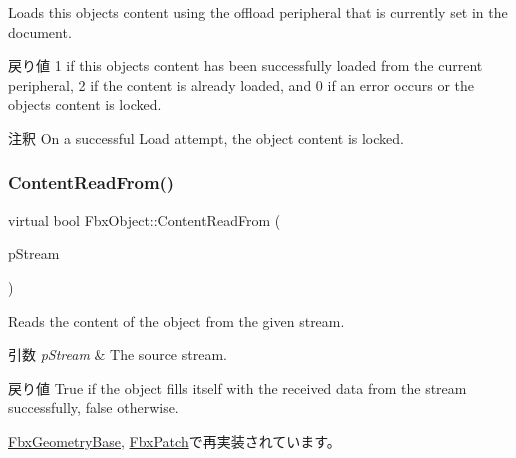 Loads this object\textquotesingle{}s content using the offload peripheral that is currently set in the document. \begin{DoxyReturn}{戻り値}
1 if this object\textquotesingle{}s content has been successfully loaded from the current peripheral, 2 if the content is already loaded, and 0 if an error occurs or the object\textquotesingle{}s content is locked. 
\end{DoxyReturn}
\begin{DoxyRemark}{注釈}
On a successful Load attempt, the object content is locked. 
\end{DoxyRemark}
\mbox{\label{class_fbx_object_aeb4255bda633e1986730748758a7cf6c}} 
\subsubsection{\texorpdfstring{Content\+Read\+From()}{ContentReadFrom()}}
{\footnotesize\ttfamily virtual bool Fbx\+Object\+::\+Content\+Read\+From (\begin{DoxyParamCaption}\item[{const \hyperlink{class_fbx_stream}{Fbx\+Stream} \&}]{p\+Stream }\end{DoxyParamCaption})\hspace{0.3cm}{\ttfamily [virtual]}}

Reads the content of the object from the given stream. 
\begin{DoxyParams}{引数}
{\em p\+Stream} & The source stream. \\
\hline
\end{DoxyParams}
\begin{DoxyReturn}{戻り値}
{\ttfamily True} if the object fills itself with the received data from the stream successfully, {\ttfamily false} otherwise. 
\end{DoxyReturn}


\hyperlink{class_fbx_geometry_base_a6d34ab23d253b07cac24267177096c1a}{Fbx\+Geometry\+Base}, \hyperlink{class_fbx_patch_ad1aac4a2e0e820f27ff9a0123ba5756e}{Fbx\+Patch}で再実装されています。

\mbox{\label{class_fbx_object_ac28653a3c65e840498eebfb54276e483}} 
